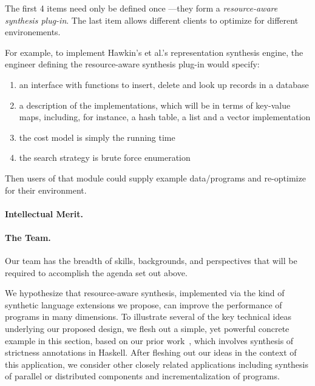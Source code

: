 The first 4 items need only be defined once ---they form a
\emph{resource-aware synthesis plug-in}.  The last item allows
different clients to optimize for different environements.

For example, to implement Hawkin's et al.'s representation synthesis engine, the
engineer defining the resource-aware synthesis plug-in would
specify:

\begin{enumerate}
\item an interface with functions to insert, delete and look up records in a database
\item a description of the implementations, which will be in terms of key-value maps,
including, for instance, a hash table, a list and a vector implementation
\item the cost model is simply the running time
\item the search strategy is brute force enumeration
\end{enumerate}

Then users of that module could supply example data/programs and re-optimize for
their environment.









\paragraph*{Intellectual Merit.}


\paragraph{The Team.}  Our team has the breadth of skills, backgrounds, and perspectives that will be required to accomplish the agenda set out above.  


We hypothesize that resource-aware synthesis, implemented via the kind
of synthetic language extensions we propose, can improve the
performance of programs in many dimensions.  To illustrate several of
the key technical ideas underlying our proposed design, we flesh out a
simple, yet powerful concrete example in this section, based on our
prior work~\cite{autobahn}, which involves synthesis of strictness
annotations in Haskell.  After fleshing out our ideas in the context
of this application, we consider other closely related applications
including synthesis of parallel or distributed components and
incrementalization of programs.

